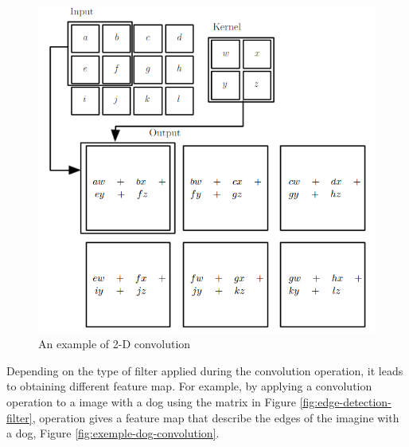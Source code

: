  \begin{figure}[htbp]
  \centerline{\includegraphics[scale=0.45]{fig/convolution+op.PNG}}  
  \caption{An example of 2-D convolution \cite{Mallat:2008:WTS:1525499}}
  \label{fig:exemple-2d-convolution}
\end{figure}

Depending on the type of filter applied during the convolution operation, it leads to obtaining different feature map.
For example, by applying a convolution operation to  a image with a dog  using the matrix 
in Figure \ref{fig:edge-detection-filter}, operation gives a feature map that describe the edges of the
imagine with a dog, Figure \ref{fig:exemple-dog-convolution}.

